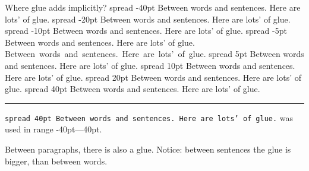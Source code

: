 \begin{frame}{Where glue adds implicitly?}\relax
    \obeylines
    \hbox spread -40pt {Between words and sentences. Here are lots' of glue.}
    \hbox spread -20pt {Between words and sentences. Here are lots' of glue.}
    \hbox spread -10pt {Between words and sentences. Here are lots' of glue.}
    \hbox spread -5pt {Between words and sentences. Here are lots' of glue.}
    \hbox{Between words and sentences. Here are lots' of glue.}
    \hbox spread 5pt {Between words and sentences. Here are lots' of glue.}
    \hbox spread 10pt {Between words and sentences. Here are lots' of glue.}
    \hbox spread 20pt {Between words and sentences. Here are lots' of glue.}
    \hbox spread 40pt {Between words and sentences. Here are lots' of glue.}
    
    \inpause
    \vspace{1ex}
    \hrule
    \texttt{\hbox spread 40pt {Between words and sentences. Here are lots' of glue.}} was used
    in range -40pt---40pt.
    
    Between paragraphs, there is also a glue. Notice: between sentences the glue is bigger, than between words.
\end{frame}



